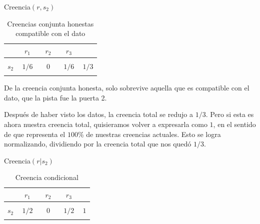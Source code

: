\documentclass[a4paper,10pt]{book}
\begin{document}
\begin{table}[H]
\centering
Creencia$(r,s_2)$ \\ \vspace{0.3cm}
 \begin{tabular}{c|c|c|c||c} \setlength\tabcolsep{0.4cm} 
        & \, $r_1$ \, &  \, $r_2$ \, & \, $r_3$ \, &  \phantom{\bm{$1/3$}} \\ \hline 
  &  &  &  & \\ \hline
  $s_2$ & $1/6$ & $0$ & $1/6$ & $1/3$\\ \hline
  &  &  & &  \\ 
\end{tabular}
\caption{Creencias conjunta honestas compatible con el dato}
\label{tab:creencia_condicional_proporcional}
\end{table}

De la creencia conjunta honesta, solo sobrevive aquella que es compatible con el dato, que la pista fue la puerta 2.
 
\vspace{0.3cm}

Después de haber visto los datos, la creencia total se redujo a $1/3$.
Pero si esta es ahora nuestra creencia total, quisieramos volver a expresarla como $1$, en el sentido de que representa el $100$\% de nuestras creencias actuales.
Esto se logra normalizando, dividiendo por la creencia total que nos quedó $1/3$.
\begin{table}[H]
\centering
Creencia$(r|s_2)$ \\ \vspace{0.3cm}
 \begin{tabular}{c|c|c|c||c} \setlength\tabcolsep{0.4cm} 
        & \, $r_1$ \, &  \, $r_2$ \, & \, $r_3$ \, &  \phantom{\bm{$1/3$}} \\ \hline 
  &  &  &  & \\ \hline
  $s_2$ & $1/2$ & $0$ & $1/2$ & $1$ \\ \hline
  &  &  & &  \\ 
\end{tabular}
\caption{Creencia condicional}
\label{tab:creencia_condicional}
\end{table}
\end{document}
